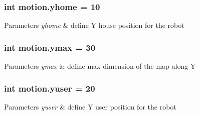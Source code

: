 \subsubsection[{\texorpdfstring{yhome}{yhome}}]{\setlength{\rightskip}{0pt plus 5cm}int motion.\+yhome = 10}\hypertarget{namespacemotion_ad24c81915bdf6ae465698c9f63e0c419}{}\label{namespacemotion_ad24c81915bdf6ae465698c9f63e0c419}

\begin{DoxyParams}{Parameters}
{\em yhome} & define Y house position for the robot \\
\hline
\end{DoxyParams}
\subsubsection[{\texorpdfstring{ymax}{ymax}}]{\setlength{\rightskip}{0pt plus 5cm}int motion.\+ymax = 30}\hypertarget{namespacemotion_a93496959e7cd7b64c958600e13052b02}{}\label{namespacemotion_a93496959e7cd7b64c958600e13052b02}

\begin{DoxyParams}{Parameters}
{\em ymax} & define max dimension of the map along Y \\
\hline
\end{DoxyParams}
\subsubsection[{\texorpdfstring{yuser}{yuser}}]{\setlength{\rightskip}{0pt plus 5cm}int motion.\+yuser = 20}\hypertarget{namespacemotion_ae750031c9c1b1e4435481bee11eaf94e}{}\label{namespacemotion_ae750031c9c1b1e4435481bee11eaf94e}

\begin{DoxyParams}{Parameters}
{\em yuser} & define Y user position for the robot \\
\hline
\end{DoxyParams}
